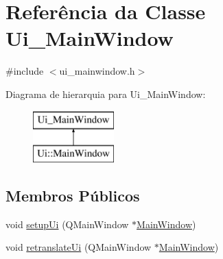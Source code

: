 \hypertarget{class_ui___main_window}{}\section{Referência da Classe Ui\+\_\+\+Main\+Window}
\label{class_ui___main_window}


{\ttfamily \#include $<$ui\+\_\+mainwindow.\+h$>$}

Diagrama de hierarquia para Ui\+\_\+\+Main\+Window\+:\begin{figure}[H]
\begin{center}
\leavevmode
\includegraphics[height=2.000000cm]{class_ui___main_window}
\end{center}
\end{figure}
\subsection*{Membros Públicos}
\begin{DoxyCompactItemize}
\item 
void \mbox{\hyperlink{class_ui___main_window_acf4a0872c4c77d8f43a2ec66ed849b58}{setup\+Ui}} (Q\+Main\+Window $\ast$\mbox{\hyperlink{class_main_window}{Main\+Window}})
\item 
void \mbox{\hyperlink{class_ui___main_window_a097dd160c3534a204904cb374412c618}{retranslate\+Ui}} (Q\+Main\+Window $\ast$\mbox{\hyperlink{class_main_window}{Main\+Window}})
\end{DoxyCompactItemize}
